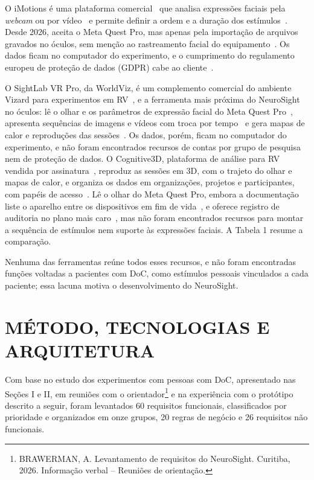\documentclass[conference,a4paper,10pt]{IEEEtran}
\begin{document}
O iMotions é uma plataforma comercial~\cite{IMOTIONS-PRICE} que analisa expressões faciais pela \textit{webcam} ou por vídeo~\cite{IMOTIONS-FEA} e permite definir a ordem e a duração dos estímulos~\cite{IMOTIONS-SB}. Desde 2026, aceita o Meta Quest Pro, mas apenas pela importação de arquivos gravados no óculos, sem menção ao rastreamento facial do equipamento~\cite{IMOTIONS-NEWS}. Os dados ficam no computador do experimento, e o cumprimento do regulamento europeu de proteção de dados (GDPR) cabe ao cliente~\cite{IMOTIONS-TOS}.

O SightLab VR Pro, da WorldViz, é um complemento comercial do ambiente Vizard para experimentos em RV~\cite{SIGHTLAB}, \cite{WORLDVIZ-PRICE} e a ferramenta mais próxima do NeuroSight no óculos: lê o olhar e os parâmetros de expressão facial do Meta Quest Pro~\cite{SIGHTLAB-FACE}, apresenta sequências de imagens e vídeos com troca por tempo~\cite{SIGHTLAB-MEDIA} e gera mapas de calor e reproduções das sessões~\cite{SIGHTLAB}. Os dados, porém, ficam no computador do experimento, e não foram encontrados recursos de contas por grupo de pesquisa nem de proteção de dados. O Cognitive3D, plataforma de análise para RV vendida por assinatura~\cite{COG3D-PRICING}, reproduz as sessões em 3D, com o trajeto do olhar e mapas de calor, e organiza os dados em organizações, projetos e participantes, com papéis de acesso~\cite{COG3D-CONCEPTS}. Lê o olhar do Meta Quest Pro, embora a documentação liste o aparelho entre os dispositivos em fim de vida~\cite{COG3D-HARDWARE}, e oferece registro de auditoria no plano mais caro~\cite{COG3D-PRICING}, mas não foram encontrados recursos para montar a sequência de estímulos nem suporte às expressões faciais. A Tabela 1 resume a comparação.

Nenhuma das ferramentas reúne todos esses recursos, e não foram encontradas funções voltadas a pacientes com DoC, como estímulos pessoais vinculados a cada paciente; essa lacuna motiva o desenvolvimento do NeuroSight.

\section{MÉTODO, TECNOLOGIAS E ARQUITETURA}

Com base no estudo dos experimentos com pessoas com DoC, apresentado nas Seções I e II, em reuniões com o orientador\footnote{BRAWERMAN, A. Levantamento de requisitos do NeuroSight. Curitiba, 2026. Informação verbal -- Reuniões de orientação.} e na experiência com o protótipo descrito a seguir, foram levantados 60 requisitos funcionais, classificados por prioridade e organizados em onze grupos, 20 regras de negócio e 26 requisitos não funcionais.
\end{document}
